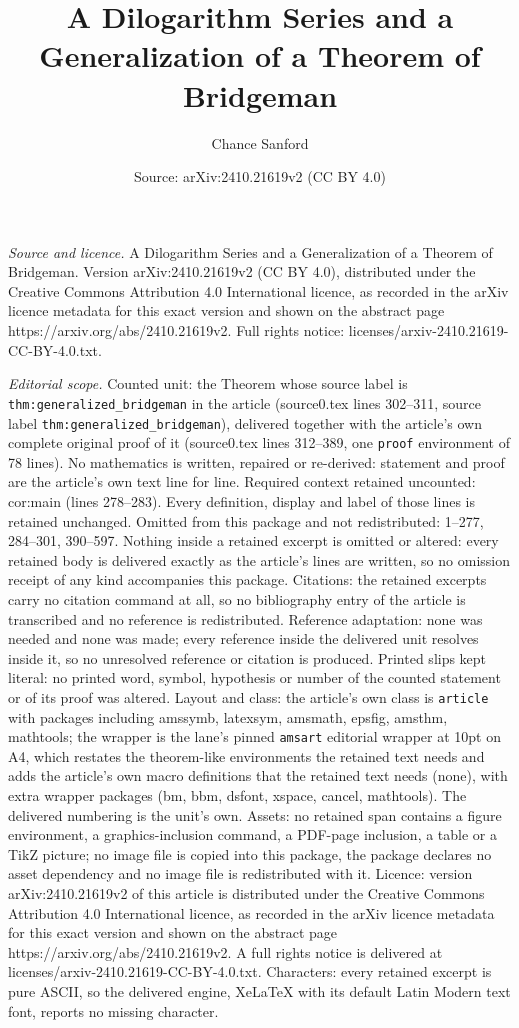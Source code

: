 \documentclass[10pt,a4paper]{amsart}
\title[A Dilogarithm Series and a Generalization of a Theorem of Br]{A Dilogarithm Series and a Generalization of a Theorem of Bridgeman}
\author{Chance Sanford}
\date{Source: arXiv:2410.21619v2 (CC BY 4.0)}
\begin{document}
\maketitle

\noindent\emph{Source and licence.} A Dilogarithm Series and a Generalization of a Theorem of Bridgeman. Version arXiv:2410.21619v2 (CC BY 4.0), distributed under the Creative Commons Attribution 4.0 International licence, as recorded in the arXiv licence metadata for this exact version and shown on the abstract page https://arxiv.org/abs/2410.21619v2. Full rights notice: licenses/arxiv-2410.21619-CC-BY-4.0.txt.\par\smallskip

\noindent\textit{Editorial scope.} Counted unit: the Theorem whose source label is \texttt{thm:generalized\_bridgeman} in the article (source0.tex lines 302--311, source label \texttt{thm:generalized\_bridgeman}), delivered together with the article's own complete original proof of it (source0.tex lines 312--389, one \texttt{proof} environment of 78 lines). No mathematics is written, repaired or re-derived: statement and proof are the article's own text line for line. Required context retained uncounted: cor:main (lines 278--283). Every definition, display and label of those lines is retained unchanged. Omitted from this package and not redistributed: 1--277, 284--301, 390--597. Nothing inside a retained excerpt is omitted or altered: every retained body is delivered exactly as the article's lines are written, so no omission receipt of any kind accompanies this package. Citations: the retained excerpts carry no citation command at all, so no bibliography entry of the article is transcribed and no reference is redistributed. Reference adaptation: none was needed and none was made; every reference inside the delivered unit resolves inside it, so no unresolved reference or citation is produced. Printed slips kept literal: no printed word, symbol, hypothesis or number of the counted statement or of its proof was altered. Layout and class: the article's own class is \texttt{article} with packages including amssymb, latexsym, amsmath, epsfig, amsthm, mathtools; the wrapper is the lane's pinned \texttt{amsart} editorial wrapper at 10pt on A4, which restates the theorem-like environments the retained text needs and adds the article's own macro definitions that the retained text needs (none), with extra wrapper packages (bm, bbm, dsfont, xspace, cancel, mathtools). The delivered numbering is the unit's own. Assets: no retained span contains a figure environment, a graphics-inclusion command, a PDF-page inclusion, a table or a TikZ picture; no image file is copied into this package, the package declares no asset dependency and no image file is redistributed with it. Licence: version arXiv:2410.21619v2 of this article is distributed under the Creative Commons Attribution 4.0 International licence, as recorded in the arXiv licence metadata for this exact version and shown on the abstract page https://arxiv.org/abs/2410.21619v2. A full rights notice is delivered at licenses/arxiv-2410.21619-CC-BY-4.0.txt. Characters: every retained excerpt is pure ASCII, so the delivered engine, XeLaTeX with its default Latin Modern text font, reports no missing character.
\end{document}
